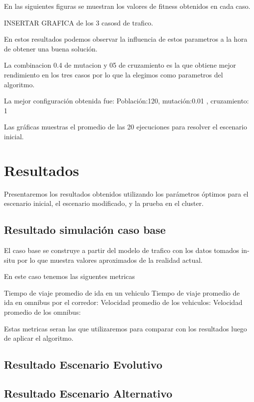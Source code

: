 En las siguientes figuras se muestran los valores de fitness obtenidos en cada caso.


INSERTAR GRAFICA de los 3 casosd de trafico.

En estos resultados podemos observar la influencia de estos parametros a la hora de obtener una buena solución.

La combinacion 0.4 de mutacion y 05 de cruzamiento es la que obtiene mejor rendimiento en los tres casos por lo que la elegimos como parametros del algoritmo.

La mejor  configuración obtenida fue:
Población:120, mutación:0.01 , cruzamiento: 1

Las gráficas muestras el promedio de las 20 ejecuciones para resolver el escenario inicial.







\section{Resultados}
Presentaremos los resultados obtenidos  utilizando los parámetros óptimos  para el escenario inicial, el escenario modificado, y la prueba en el cluster.

\subsection{Resultado simulación caso base}
El caso base se construye a partir del modelo de trafico con los datos tomados in-situ por lo que muestra valores aproximados de la realidad actual.

En este caso tenemos las siguentes metricas

Tiempo de viaje promedio de ida en un vehiculo
Tiempo de viaje promedio de ida en omnibus por el corredor:
Velocidad promedio de los vehiculos:
Velocidad promedio de los omnibus:

Estas metricas seran las que utilizaremos para comparar con los resultados luego de aplicar el algoritmo.

\subsection{Resultado Escenario Evolutivo}
\subsection{Resultado Escenario Alternativo}

